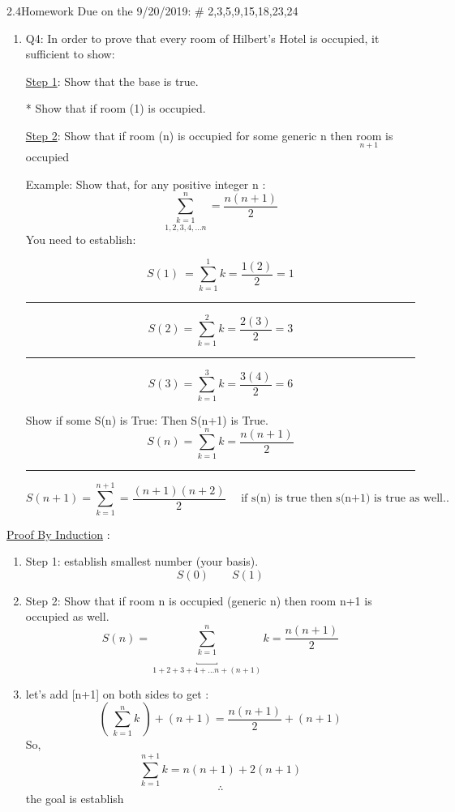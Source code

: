 \documentclass[10pt,letterpaper]{article}
\begin{document}
{
    2.4\quad Homework Due on the 9/20/2019: \quad \# 2,3,5,9,15,18,23,24
    \vspace{2.0em}

\begin{enumerate}
    \item[] Q4: In order to prove that every room of Hilbert's Hotel is occupied, it sufficient to show:
    \vspace{1em}
    \par{\underline{Step 1}: Show that the base is true.
    
        * Show that if room (1) is occupied.
    \par{\underline{Step 2}: Show that if room (n) is occupied for some generic n then $\underset{n+1}{\text{room}}$ is occupied
        }
        }
    Example: Show that, for any positive integer n :
    $$ \underset{1,2,3,4,\ldots n}{\sum^{n}_{k=1}} = \frac{n(n+1)}{2} $$
    You need to establish:

       $$        S(1) \ = \sum_{k=1}^{1} k = \frac{1(2)}{2} = 1     $$
\begin{center}\rule{8cm}{0.4pt}\end{center}
    $$ S(2) = \sum^{2}_{k=1} k = \frac{2(3)}{2} = 3 $$
\begin{center}\rule{8cm}{0.4pt}\end{center}
    $$ S(3) = \sum^{3}_{k=1} k = \frac{3(4)}{2} = 6 $$
    
Show if some S(n) is True: Then S(n+1) is True.
$$S(n) = \sum^{n}_{k=1} k = \frac{n(n+1)}{2} $$
\begin{center}\rule{8cm}{0.4pt}\end{center}
$$S(n+1) = \sum^{n+1}_{k=1} = \frac{(n+1)(n+2)}{2} \quad \text{ if s(n) is true then s(n+1) is true as well..}$$
    
\end{enumerate}

\newpage
\underline{Proof By Induction} :
\begin{enumerate}
    \item [] Step 1: establish smallest number (your basis).
        $$S(0) \quad \quad S(1)$$
    \item[] Step 2: Show that if room n is occupied (generic n) then room n+1 is occupied as well.
        $$S(n) = \underbracket{\sum^{n}_{k=1}}_{1+2+3+4+\ldots n + (n+1)} k = \frac{n(n+1)}{2}$$
    \item[] let's add [n+1] on both sides to get :
    $$ \left( \ \sum^{n}_{k=1} k  \ \right)  + (n+1) = \frac{n (n+1)}{2} + (n+1)$$
    So, $$ \sum^{n+1}_{k=1} k = n(n+1)+2(n+1) $$
    $$\therefore$$
    the goal is establish \checkmark
    
\end{enumerate}
    
}
\end{document}
